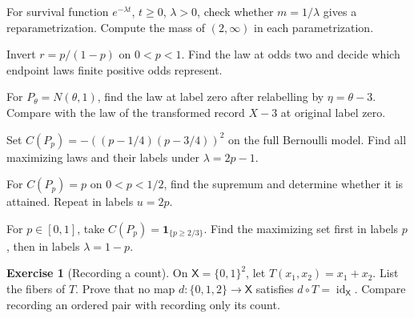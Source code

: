\documentclass[11pt,oneside]{book}
\theoremstyle{definition}
\newtheorem{exercise}{Exercise}[section]
\theoremstyle{remark}
\begin{document}
\begin{practiceexercise}
\label{wex:exponential-rate-mean}
For survival function $e^{-\lambda t}$, $t\ge0$, $\lambda>0$, check whether
$m=1/\lambda$ gives a reparametrization. Compute the mass of $(2,\infty)$ in
each parametrization.
\end{practiceexercise}

\begin{practiceexercise}
\label{wex:odds-reparam}
Invert $r=p/(1-p)$ on $0<p<1$. Find the law at odds two and decide which
endpoint laws finite positive odds represent.
\end{practiceexercise}

\begin{practiceexercise}
\label{wex:shifted-location-label}
For $P_\theta=N(\theta,1)$, find the law at label zero after relabelling by
$\eta=\theta-3$. Compare with the law of the transformed record $X-3$ at
original label zero.
\end{practiceexercise}

\begin{practiceexercise}
\label{wex:quadratic-tied-criterion}
Set $C(P_p)=-((p-1/4)(p-3/4))^2$ on the full Bernoulli model. Find all
maximizing laws and their labels under $\lambda=2p-1$.
\end{practiceexercise}

\begin{practiceexercise}
\label{wex:restricted-criterion-supremum}
For $C(P_p)=p$ on $0<p<1/2$, find the supremum and determine whether it is
attained. Repeat in labels $u=2p$.
\end{practiceexercise}

\begin{practiceexercise}
\label{wex:criterion-with-plateau}
For $p\in[0,1]$, take $C(P_p)=\mathbf1_{\{p\ge2/3\}}$. Find the maximizing
set first in labels $p$, then in labels $\lambda=1-p$.
\end{practiceexercise}

\begin{exercise}[Recording a count]
\label{exer:recording-a-count}
On $\mathsf X=\{0,1\}^2$, let $T(x_1,x_2)=x_1+x_2$.
List the fibers of $T$. Prove that no map
$d:\{0,1,2\}\to\mathsf X$ satisfies $d\circ T=\operatorname{id}_{\mathsf X}$.
Compare recording an ordered pair with recording only its count.
\end{exercise}
\end{document}
